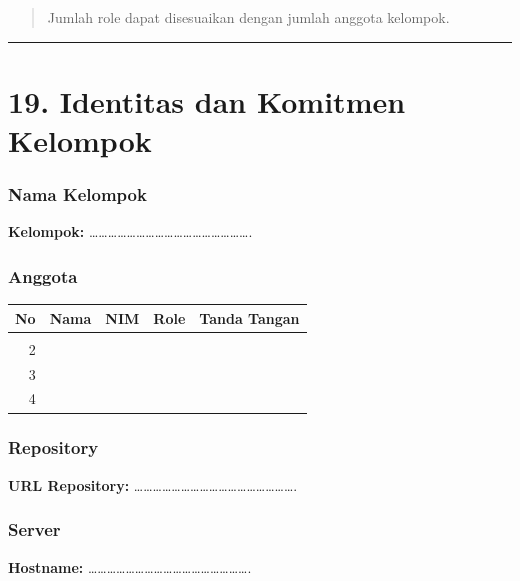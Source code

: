 \documentclass[
]{article}
\begin{document}
\begin{quote}
Jumlah role dapat disesuaikan dengan jumlah anggota kelompok.
\end{quote}

\begin{center}\rule{0.5\linewidth}{0.5pt}\end{center}

\section{19. Identitas dan Komitmen
Kelompok}\label{identitas-dan-komitmen-kelompok}

\subsubsection{Nama Kelompok}\label{nama-kelompok}

\textbf{Kelompok:}
\ldots\ldots\ldots\ldots\ldots\ldots\ldots\ldots\ldots\ldots\ldots\ldots\ldots\ldots\ldots\ldots\ldots.

\subsubsection{Anggota}\label{anggota}

\begin{longtable}[]{@{}rllll@{}}
\toprule\noalign{}
No & Nama & NIM & Role & Tanda Tangan \\
\midrule\noalign{}
\endhead
\bottomrule\noalign{}
\endlastfoot
1 & & & & \\
2 & & & & \\
3 & & & & \\
4 & & & & \\
\end{longtable}

\subsubsection{Repository}\label{repository}

\textbf{URL Repository:}
\ldots\ldots\ldots\ldots\ldots\ldots\ldots\ldots\ldots\ldots\ldots\ldots\ldots\ldots\ldots\ldots\ldots.

\subsubsection{Server}\label{server-1}

\textbf{Hostname:}
\ldots\ldots\ldots\ldots\ldots\ldots\ldots\ldots\ldots\ldots\ldots\ldots\ldots\ldots\ldots\ldots\ldots.
\end{document}
